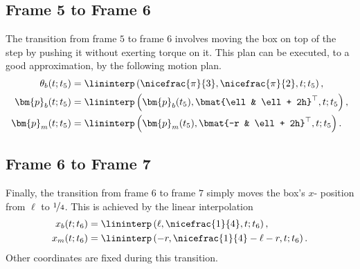 \subsection{Frame 5 to Frame 6}
\label{sec:frame5to6}
%
The transition from frame $5$ to frame $6$ involves moving the box on top of the
step by pushing it without exerting torque on it. This plan can be executed, to 
a good approximation, by the following motion plan.
%
\begin{align}
\begin{split}
  \theta_b(t; t_5) &= \lininterp\left(\nicefrac{\pi}{3}, \nicefrac{\pi}{2}, t;
  t_5\right), \\
  \bm{p}_b(t; t_5) &= \lininterp\left(\bm{p}_b(t_5), \bmat{\ell & \ell +
  2h}^\top, t; t_5\right), \\
  \bm{p}_m(t; t_5) &= \lininterp\left(\bm{p}_m(t_5), \bmat{-r & \ell +
  2h}^\top, t; t_5\right).
\end{split}
  \label{eq:frame5to6}
\end{align}
%

\subsection{Frame 6 to Frame 7}
\label{sec:frame6to7}
%
Finally, the transition from frame $6$ to frame $7$ simply moves the box's $x$-
position from $\ell$ to $\nicefrac{1}{4}$. This is achieved by the linear
interpolation
%
\begin{align}
\begin{split}
  x_b(t; t_6) &= \lininterp\left(\ell, \nicefrac{1}{4}, t; t_6\right), \\
  x_m(t; t_6) &= \lininterp\left(-r, \nicefrac{1}{4}-\ell-r, t; t_6\right).
\end{split}
  \label{eq:frame6to7}
\end{align}
%
Other coordinates are fixed during this transition.
